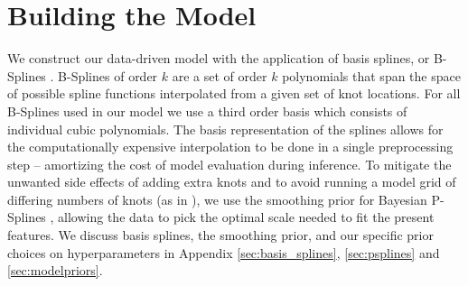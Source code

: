 \section{Building the Model} \label{sec:methods}

We construct our data-driven model with the application of basis splines, or B-Splines \citep{deBoor78}. B-Splines of order $k$ are a set of order $k$ polynomials that 
span the space of possible spline functions interpolated from a given set of knot locations. For all B-Splines used in our model we use a third order basis which consists of individual cubic polynomials. The basis representation of the splines allows for the computationally
expensive interpolation to be done in a single preprocessing step -- amortizing the cost of model evaluation during inference. To mitigate the unwanted side effects of 
adding extra knots and to avoid running a model grid of differing numbers of knots (as in \citet{Edelman_2022ApJ}), we use the smoothing prior for Bayesian P-Splines \citep{eilers2021practical,BayesianPSplines,Jullion2007RobustSO}, 
allowing the data to pick the optimal scale needed to fit the present features. We discuss basis splines, the smoothing prior, and our specific prior choices on hyperparameters in Appendix \ref{sec:basis_splines}, \ref{sec:psplines} and \ref{sec:modelpriors}.

